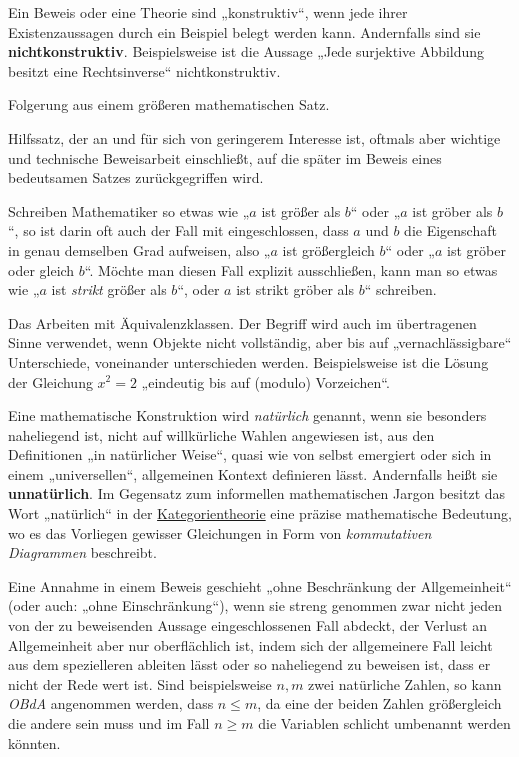\begin{description}[labelindent=0pt, leftmargin=0pt]
    \item[Konstruktiv:] Ein Beweis oder eine Theorie sind „konstruktiv“, wenn jede ihrer Existenzaussagen durch ein Beispiel belegt werden kann. Andernfalls sind sie \textbf{nichtkonstruktiv}. Beispielsweise ist die Aussage „Jede surjektive Abbildung besitzt eine Rechtsinverse“ nichtkonstruktiv.
    
    \item[Korollar:] Folgerung aus einem größeren mathematischen Satz.

    \item[Lemma:] Hilfssatz, der an und für sich von geringerem Interesse ist, oftmals aber wichtige und technische Beweisarbeit einschließt, auf die später im Beweis eines bedeutsamen Satzes zurückgegriffen wird.

    \item[Mathematischer Komparativ:] Schreiben Mathematiker so etwas wie „$a$ ist größer als $b$“ oder „$a$ ist gröber als $b$“, so ist darin oft auch der Fall mit eingeschlossen, dass $a$ und $b$ die Eigenschaft in genau demselben Grad aufweisen, also „$a$ ist größergleich $b$“ oder „$a$ ist gröber oder gleich $b$“. Möchte man diesen Fall explizit ausschließen, kann man so etwas wie „$a$ ist \emph{strikt} größer als $b$“, oder $a$ ist strikt gröber als $b$“ schreiben.
    
    \item[Modulo:] Das Arbeiten mit Äquivalenzklassen. Der Begriff wird auch im übertragenen Sinne verwendet, wenn Objekte nicht vollständig, aber bis auf „vernachlässigbare“ Unterschiede, voneinander unterschieden werden. Beispielsweise ist die Lösung der Gleichung $x^2=2$ „eindeutig bis auf (\glq modulo\grq) Vorzeichen“.

    \item[Natürlich:] Eine mathematische Konstruktion wird \emph{natürlich} genannt, wenn sie besonders naheliegend ist, nicht auf willkürliche Wahlen angewiesen ist, aus den Definitionen „in natürlicher Weise“, quasi wie von selbst emergiert oder sich in einem „universellen“, allgemeinen Kontext definieren lässt. Andernfalls heißt sie \textbf{unnatürlich}. Im Gegensatz zum informellen mathematischen Jargon besitzt das Wort „natürlich“ in der \href{https://ncatlab.org/nlab/show/category+theory}{Kategorientheorie} eine präzise mathematische Bedeutung, wo es das Vorliegen gewisser Gleichungen in Form von \emph{kommutativen Diagrammen} beschreibt.

    \item[Ohne Beschränkung der Allgemeinheit (OBdA):] Eine Annahme in einem Beweis geschieht „ohne Beschränkung der Allgemeinheit“ (oder auch: „ohne Einschränkung“), wenn sie streng genommen zwar nicht jeden von der zu beweisenden Aussage eingeschlossenen Fall abdeckt, der Verlust an Allgemeinheit aber nur oberflächlich ist, indem sich der allgemeinere Fall leicht aus dem spezielleren ableiten lässt oder so naheliegend zu beweisen ist, dass er nicht der Rede wert ist. Sind beispielsweise $n,m$ zwei natürliche Zahlen, so kann \emph{OBdA} angenommen werden, dass $n\le m$, da eine der beiden Zahlen größergleich die andere sein muss und im Fall $n\ge m$ die Variablen schlicht umbenannt werden könnten.


\end{description}
